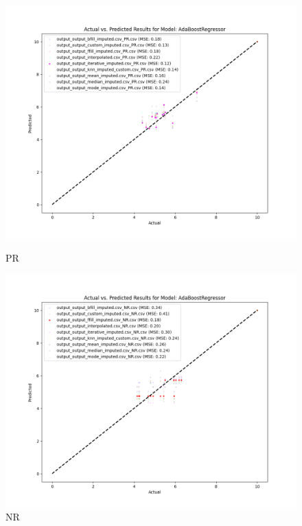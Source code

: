 \begin{figure}[H]
    \centering
    \begin{minipage}{0.495\textwidth}
        \centering
        \includegraphics[width=\linewidth]{reg_section_specxtra/images_reg_training/PR_AdaBoostRegressor_plot.png}
        \caption{PR}
        \label{fig_reg_specxtra:pr_reg_training}
    \end{minipage}\hfill
    \begin{minipage}{0.495\textwidth}
        \centering
        \includegraphics[width=\linewidth]{reg_section_specxtra/images_reg_training/NR_AdaBoostRegressor_plot.png}
        \caption{NR}
        \label{fig_reg_specxtra:nr_reg_training}
    \end{minipage}
\end{figure}

